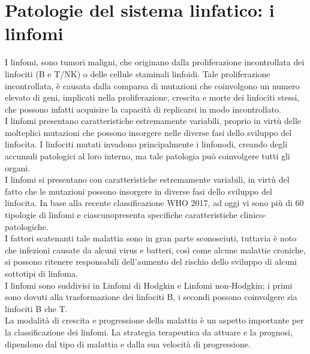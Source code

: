 \section{Patologie del sistema linfatico: i linfomi}
I linfomi, sono tumori maligni, che originano dalla proliferazione incontrollata dei linfociti (B e T/NK)
o delle cellule staminali linfoidi. 
Tale proliferazione incontrollata, è causata dalla comparsa di mutazioni che coinvolgono un numero elevato di geni, 
implicati nella proliferazione, crescita e morte dei linfociti stessi, 
che possono infatti acquisire la capacità di replicarsi in modo incontrollato\cite{LINFOMIAIL}.\\ 
I linfomi presentano caratteristiche estremamente variabili, proprio in virtù delle molteplici mutazioni 
che possono insorgere nelle diverse fasi dello sviluppo del linfocita. 
I linfociti mutati invadono principalmente i linfonodi, creando degli accumuli patologici al loro interno, 
ma tale patologia può coinvolgere tutti gli organi.\\
I linfomi si presentano con caratteristiche estremamente variabili, in virtù del fatto che le mutazioni 
possono insorgere in diverse fasi dello sviluppo del linfocita\cite{LINFOMIAIL}. In base alla recente classificazione 
WHO 2017, ad oggi vi sono più di 60 tipologie di linfomi e ciascunopresenta specifiche caratteristiche 
clinico-patologiche\cite{AIOM}.\\
I fattori scatenanti tale malattia sono in gran parte sconosciuti, tuttavia è noto che infezioni causate da alcuni virus e 
batteri, così come alcune malattie croniche, si possono ritenere responsabili dell’aumento del rischio dello 
sviluppo di alcuni sottotipi di linfoma\cite{LINFOMIAIL}.\\
I linfomi sono suddivisi in Linfomi di Hodgkin e Linfomi non-Hodgkin; 
i primi sono dovuti alla trasformazione dei linfociti B, i secondi possono coinvolgere sia linfociti B che T.\\ 
La modalità di crescita e progressione della malattia è un aspetto importante per la classificazione dei linfomi.
La strategia terapeutica da attuare e la prognosi, dipendono dal tipo di malattia e dalla sua velocità di 
progressione\cite{LINFOMIAIL}.\\

